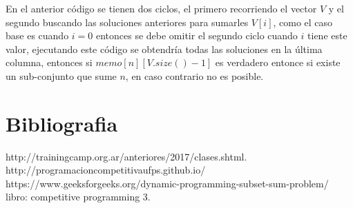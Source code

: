 \documentclass[12pt, a4paper]{article}
\begin{document}
	En el anterior código se tienen dos ciclos, el primero recorriendo el vector $V$ y el segundo buscando las 
	soluciones anteriores para sumarles $V[i]$, como el caso base es cuando $i=0$ entonces se debe omitir el segundo
	ciclo cuando $i$ tiene este valor, ejecutando este código se obtendría todas las soluciones en la última columna,
	entonces si $memo[n][V.size()-1]$ es verdadero entonce si existe un sub-conjunto que sume $n$, en caso contrario
	no es posible.

	
	\section{Bibliografia}
	
	http://trainingcamp.org.ar/anteriores/2017/clases.shtml.\\
	http://programacioncompetitivaufps.github.io/\\
	https://www.geeksforgeeks.org/dynamic-programming-subset-sum-problem/\\
	libro: competitive programming 3.\\

	
\end{document}
